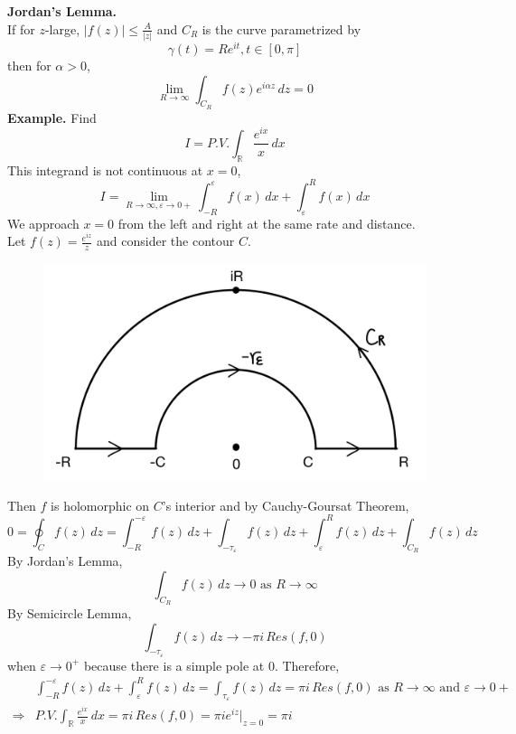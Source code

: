 \documentclass[11pt]{article}
\begin{document}
\textbf{Jordan's Lemma.}\\
If for $z$-large, 
$ |f(z)| \leqslant \frac{A}{|z|} $ and $C_R$ is the curve parametrized by 
$$ \gamma(t) = Re^{it}, t \in [0, \pi]$$
then for $\alpha > 0$, 
$$ \lim_{R \to \infty}\int_{C_R}f(z) e^{i\alpha z}\, dz = 0$$ 
\newline
\newline
\textbf{Example.} Find 
$$ I = P.V.\int_{\mathbb{R}}\frac{e^{ix}}{x} \,dx$$
This integrand is not continuous at $x = 0$, 
$$ I = \lim_{R \to \infty, \varepsilon \to 0+} \int_{-R}^{\varepsilon}f(x) \, dx + \int_{\varepsilon}^{R}f(x) \, dx$$
We approach $x = 0$ from the left and right at the same rate and distance. \\
Let $f(z) = \frac{e^{iz}}{z}$ and consider the contour $C$.
\begin{figure}[h]
\includegraphics[scale=0.15]{21_5} 
\centering
\end{figure} 
Then $f$ is holomorphic on $C$'s interior and by Cauchy-Goursat Theorem, 
$$ 0 = \oint_Cf(z)\,dz = \int_{-R}^{-\varepsilon}f(z) \, dz + \int_{-\tau_\varepsilon}f(z) \, dz + \int_{\varepsilon}^{R}f(z) \, dz + \int_{C_R}f(z) \, dz$$
By Jordan's Lemma, 
$$\int_{C_R}f(z) \,dz \to 0 \text{ as } R\to \infty$$
By Semicircle Lemma, 
$$\int_{-\tau_\varepsilon}f(z) \, dz \to -\pi i \, Res(f, 0)$$
when $\varepsilon \to 0^+$ because there is a simple pole at 0. Therefore, 
\begin{align*}
&\int_{-R}^{-\varepsilon}f(z) \, dz + \int_{\varepsilon}^{R}f(z) \, dz = \int_{\tau_\varepsilon}f(z) \, dz = \pi i \, Res(f, 0) \text{ as } R \to \infty \text{ and } \varepsilon \to 0+ \\
\Rightarrow &P.V.\int_{\mathbb{R}}\frac{e^{ix}}{x} \, dx = \pi i \, Res(f, 0) = \pi i e^{iz} \bigg\rvert_{z = 0} = \pi i
\end{align*}
\end{document}
